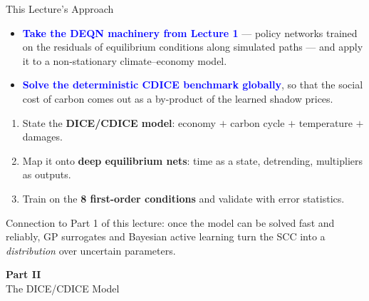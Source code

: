 \documentclass[aspectratio=169,11pt]{beamer}
\newcommand{\emphc}[1]{\textcolor{harvardcrimson}{#1}}
\begin{document}
\begin{frame}{This Lecture's Approach}
\begin{itemize}
    \item \textcolor{blue}{\textbf{Take the DEQN machinery from Lecture 1}} --- policy networks trained on the residuals of equilibrium conditions along simulated paths --- and apply it to a \emphc{non-stationary} climate--economy model.
    \item \textcolor{blue}{\textbf{Solve the deterministic CDICE benchmark globally}}, so that the social cost of carbon comes out as a by-product of the learned shadow prices.
\end{itemize}

\vspace{0.2cm}
\begin{enumerate}
    \item State the \textbf{DICE/CDICE model}: economy $+$ carbon cycle $+$ temperature $+$ damages.
    \item Map it onto \textbf{deep equilibrium nets}: time as a state, detrending, multipliers as outputs.
    \item Train on the \textbf{8 first-order conditions} and validate with error statistics.
\end{enumerate}

\vspace{0.2cm}
{\footnotesize \emphc{Connection to Part 1 of this lecture:} once the model can be solved fast and reliably, GP surrogates and Bayesian active learning turn the SCC into a \emph{distribution} over uncertain parameters.}
\end{frame}



\begin{frame}{}
\vfill
\begin{center}
{\Huge \textcolor{uzhblue}{\textbf{Part II}}}\\[12pt]
{\LARGE The DICE/CDICE Model}
\end{center}
\vfill
\end{frame}
\end{document}
